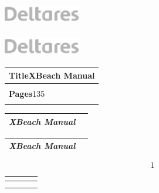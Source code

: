 \documentclass{article}
\begin{document}
\includegraphics*[width=1.34in, height=0.38in, keepaspectratio=false]{image2}

\noindent \includegraphics*[width=1.34in, height=0.38in, keepaspectratio=false]{image3}

\noindent 

\noindent 

\noindent 

\begin{tabular}{|p{1.3in}|p{1.2in}|p{1.2in}|p{0.4in}|} \hline 
\multicolumn{4}{|p{1in}|}{\textbf{Title\newline }XBeach Manual} \\ \hline 
\multicolumn{2}{|p{1in}|}{} & \multicolumn{2}{|p{1.6in}|}{} \\ \hline 
\textbf{Pages\newline }135 &  &  &  \\ \hline 
\multicolumn{4}{|p{1in}|}{} \\ \hline 
\end{tabular}



\noindent 

\begin{tabular}{|p{3.6in}|p{0.4in}|} \hline 
\textit{XBeach Manual} &  \\ \hline 
\end{tabular}



\noindent 

\begin{tabular}{|p{3.6in}|p{0.4in}|} \hline 
\textit{XBeach Manual} &  \\ \hline 
\end{tabular}


\[1\] 

\noindent 

\noindent 

\noindent 

\begin{tabular}{|p{1.2in}|p{1.2in}|p{1.2in}|p{0.5in}|} \hline 
\multicolumn{4}{|p{1in}|}{} \\ \hline 
\multicolumn{2}{|p{1in}|}{} & \multicolumn{2}{|p{1.7in}|}{} \\ \hline 
 &  &  &  \\ \hline 
\end{tabular}
\end{document}
